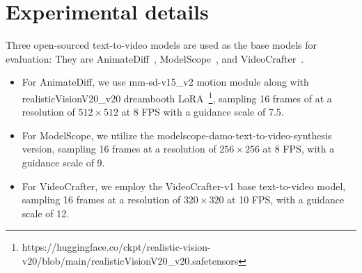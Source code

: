 \section{Experimental details}
\label{appendix:setting}
Three open-sourced text-to-video models are used as the base models for evaluation: They are AnimateDiff~\citep{guo2023animatediff}, ModelScope~\citep{wang2023modelscope,VideoFusion}, and VideoCrafter~\citep{chen2023videocrafter1}.
\begin{itemize}
    \item For AnimateDiff, we use mm-sd-v15\_v2 motion module along with realisticVisionV20\_v20 dreambooth LoRA~\footnote{https://huggingface.co/ckpt/realistic-vision-v20/blob/main/realisticVisionV20\_v20.safetensors}, sampling 16 frames of at a resolution of $512\times512$ at 8 FPS with a guidance scale of 7.5.
    \item For ModelScope, we utilize the modelscope-damo-text-to-video-synthesis version, sampling 16 frames at a resolution of $256 \times 256$ at 8 FPS, with a guidance scale of 9.
    \item For VideoCrafter, we employ the VideoCrafter-v1 base text-to-video model, sampling 16 frames at a resolution of  $320 \times 320$ at 10 FPS, with a guidance scale of 12.
\end{itemize}


